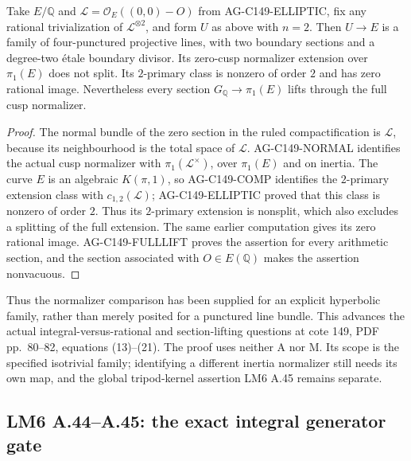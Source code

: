 \begin{proposition}
Take $E/\mathbb Q$ and $\mathcal L=\mathcal O_E((0,0)-O)$
from AG-C149-ELLIPTIC, fix any rational trivialization of
$\mathcal L^{\otimes2}$, and form $U$ as above with $n=2$.
Then $U\to E$ is a family of four-punctured projective lines,
with two boundary sections and a degree-two \'etale boundary
divisor. Its zero-cusp normalizer extension over $\pi_1(E)$
does not split. Its $2$-primary class is nonzero of order $2$
and has zero rational image. Nevertheless every section
$G_{\mathbb Q}\to\pi_1(E)$ lifts through the full cusp normalizer.
\end{proposition}
\begin{proof}
The normal bundle of the zero section in the ruled compactification
is $\mathcal L$, because its neighbourhood is the total space of
$\mathcal L$. AG-C149-NORMAL identifies the actual cusp
normalizer with $\pi_1(\mathcal L^\times)$, over $\pi_1(E)$
and on inertia. The curve $E$ is an algebraic $K(\pi,1)$, so
AG-C149-COMP identifies the $2$-primary extension class with
$c_{1,2}(\mathcal L)$; AG-C149-ELLIPTIC proved that this class
is nonzero of order $2$. Thus its $2$-primary extension is
nonsplit, which also excludes a splitting of the full extension.
The same earlier computation gives its zero rational image.
AG-C149-FULLLIFT proves the assertion for every arithmetic
section, and the section associated with $O\in E(\mathbb Q)$
makes the assertion nonvacuous.
\end{proof}

Thus the normalizer comparison has been supplied for an explicit
hyperbolic family, rather than merely posited for a punctured line
bundle. This advances the actual integral-versus-rational and
section-lifting questions at cote 149, PDF pp.~80--82,
equations (13)--(21). The proof uses neither A nor M. Its scope is
the specified isotrivial family; identifying a different inertia
normalizer still needs its own map, and the global tripod-kernel
assertion LM6 A.45 remains separate.

\subsection{LM6 A.44--A.45: the exact integral generator gate}
\label{ag:lm6}

